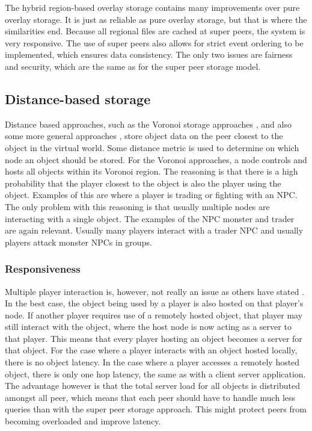 \documentclass[10pt,a4paper,journal,cspaper,compsoc]{IEEEtran}
\begin{document}
The hybrid region-based overlay storage contains many improvements over pure overlay storage. It is just as
reliable as pure overlay storage, but that is where the similarities end. Because all regional files are cached at super peers, the system is very
responsive. The use of super peers also allows for strict event ordering to be implemented, which ensures data consistency. The only two issues are
fairness and security, which are the same as for the super peer storage model.

\subsection{Distance-based storage}

Distance based approaches, such as the Voronoi storage approaches \cite{Buyukkaya_voronoi_state_management}, \cite{Hu_voronoi_IM} and also some more
general approaches \cite{colyseus_distance_based}, store object data on the peer closest to the object in the virtual world. Some distance metric is
used to determine on which node an object should be stored. For the Voronoi approaches, a node controls and hosts all objects within its Voronoi
region. The reasoning is that there is a high probability that the player closest to the object is also the player using the object. Examples of this
are where a player is trading or fighting with an NPC. The only problem with this reasoning is that usually multiple nodes are interacting with a
single object. The examples of the NPC monster and trader are again relevant. Usually many players interact with a trader NPC and usually players
attack monster NPCs in groups.

\subsubsection{Responsiveness}
Multiple player interaction is, however, not really an issue as others have stated \cite{Fan_deisgn_issues_p2p}. In the best case, the object being
used by a player is also hosted on that player's node. If another player requires use of a remotely hosted object, that player may still interact
with the object, where the host node is now acting as a server to that player. This means that every player hosting an object becomes a server for
that object. For the case where a player interacts with an object hosted locally, there is no object latency. In the case where a player accesses a
remotely hosted object, there is only one hop latency, the same as with a client server application. The advantage however is that the total server
load for all objects is distributed amongst all peer, which means that each peer should have to handle much less queries than with the super peer
storage approach. This might protect peers from becoming overloaded and improve latency.
\end{document}
